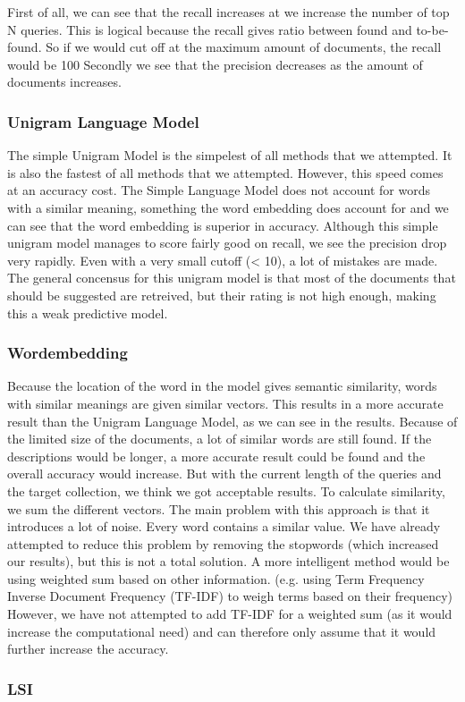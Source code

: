 First of all, we can see that the recall increases at we increase the number of top N queries. This is logical because the recall gives ratio between found and to-be-found. So if we would cut off at the maximum amount of documents, the recall would be 100%
\newline
Secondly we see that the precision decreases as the amount of documents increases. 

\subsubsection{Unigram Language Model}
The simple Unigram Model is the simpelest of all methods that we attempted. It is also the fastest of all methods that we attempted. However, this speed comes at an accuracy cost.
The Simple Language Model does not account for words with a similar meaning, something the word embedding does account for and we can see that the word embedding is superior in accuracy.
Although this simple unigram model manages to score fairly good on recall, we see the precision drop very rapidly. Even with a very small cutoff (< 10), a lot of mistakes are made. The general concensus for this unigram model is that most of the documents that should be suggested are retreived, but their rating is not high enough, making this a weak predictive model.

\subsubsection{Wordembedding}
Because the location of the word in the model gives semantic similarity, words with similar meanings are given similar vectors. This results in a more accurate result than the Unigram Language Model, as we can see in the results.
Because of the limited size of the documents, a lot of similar words are still found. If the descriptions would be longer, a more accurate result could be found and the overall accuracy would increase. But with the current length of the queries and the target collection, we think we got acceptable results.
\newline
\newline
To calculate similarity, we sum the different vectors. The main problem with this approach is that it introduces a lot of noise. Every word contains a similar value. We have already attempted to reduce this problem by removing the stopwords (which increased our results), but this is not a total solution. A more intelligent method would be using weighted sum based on other information. (e.g. using Term Frequency Inverse Document Frequency (TF-IDF) to weigh terms based on their frequency) However, we have not attempted to add TF-IDF for a weighted sum (as it would increase the computational need) and can therefore only assume that it would further increase the accuracy.

\subsubsection{LSI}
